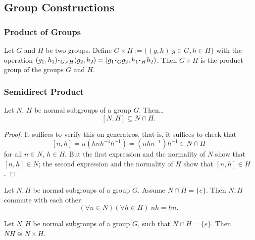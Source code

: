 \subsection{Group Constructions}\label{groupconstructions}

\subsubsection{Product of Groups}\label{groupproduct}
Let $G$ and $H$ be two groups. Define $G \times H := \{ (g,h) | g \in G, h \in H \}$ with the operation
$(g_1,h_1) \LargerCdot_{G \times H} (g_2,h_2) = (g_1 \LargerCdot_G g_2,h_1 \LargerCdot_H h_2)$. Then $G \times H$
is the product group of the groups $G$ and $H$.

\subsubsection{Semidirect Product}\label{semidirectproduct}


\begin{lemma}
Let $N$, $H$ be normal subgroups of a group $G$. Then\dots
$$[N,H] \subseteq N \cap H.$$
\end{lemma}

\begin{proof}
It suffices to verify this on generatros, that is, it suffices to check that
$$[n,h] = n(hnh^{-1}h^{-1}) = (nhn^{-1})h^{-1} \in N \cap H$$
for all $n \in N$, $h \in H$. But the first expression and the normality of $N$ show that $[n,h] \in N$; the second expression and the
normality of $H$ show that $[n,h] \in H$.
\end{proof}

\begin{corollary}
Let $N, H$ be normal subgroups of a group $G$. Assume $N \cap H = \{ e \}$. Then $N, H$ commute with each other:
$$(\forall n \in N) (\forall h \in H) \; nh = hn.$$
\end{corollary}

\begin{proposition}
\label{whensubgroupsmultiply}
Let $N, H$ be normal subgroups of a group $G$, such that $N \cap H = \{ e \}$. Then $NH \cong N \times H$.
\end{proposition}

